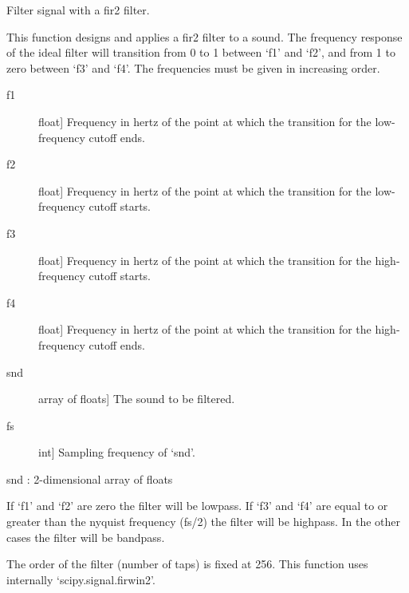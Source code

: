 \documentclass[letterpaper,10pt,english]{sphinxmanual}
\begin{document}
\begin{fulllineitems}
\label{index:sndlib.fir2Filt}
Filter signal with a fir2 filter.

This function designs and applies a fir2 filter to a sound.
The frequency response of the ideal filter will transition
from 0 to 1 between `f1' and `f2', and from 1 to zero
between `f3' and `f4'. The frequencies must be given in
increasing order.
\begin{description}
\item[{f1}] \leavevmode{[}float{]}
Frequency in hertz of the point at which the transition
for the low-frequency cutoff ends.

\item[{f2}] \leavevmode{[}float{]}
Frequency in hertz of the point at which the transition
for the low-frequency cutoff starts.

\item[{f3}] \leavevmode{[}float{]}
Frequency in hertz of the point at which the transition
for the high-frequency cutoff starts.

\item[{f4}] \leavevmode{[}float{]}
Frequency in hertz of the point at which the transition
for the high-frequency cutoff ends.

\item[{snd}] \leavevmode{[}array of floats{]}
The sound to be filtered.

\item[{fs}] \leavevmode{[}int{]}
Sampling frequency of `snd'.

\end{description}

snd : 2-dimensional array of floats

If `f1' and `f2' are zero the filter will be lowpass.
If `f3' and `f4' are equal to or greater than the nyquist
frequency (fs/2) the filter will be highpass.
In the other cases the filter will be bandpass.

The order of the filter (number of taps) is fixed at 256.
This function uses internally `scipy.signal.firwin2'.


\end{fulllineitems}
\end{document}
